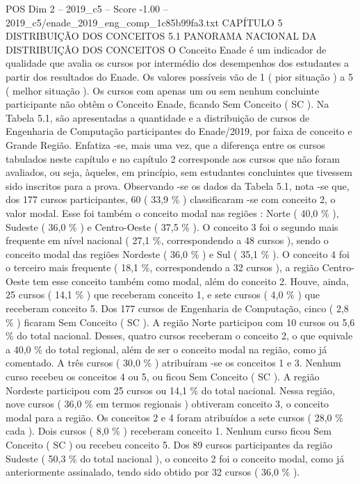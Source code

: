 \begin{textsample}{POS Dim 2 – 2019\_c5 – Score -1.00 – 2019\_c5/enade\_2019\_eng\_comp\_1c85b99fa3.txt}  \label{ex:f2_pos_336}
CAPÍTULO 5 DISTRIBUIÇÃO DOS CONCEITOS 5.1 PANORAMA NACIONAL DA DISTRIBUIÇÃO DOS CONCEITOS O Conceito Enade é um indicador de qualidade que avalia os cursos por intermédio dos desempenhos dos estudantes a partir dos resultados do Enade.
Os valores possíveis vão de 1 ( pior situação ) a 5 ( melhor situação ).
Os cursos com apenas um ou sem nenhum concluinte participante não obtêm o Conceito Enade, ficando Sem Conceito ( SC ).
Na Tabela 5.1, são apresentadas a quantidade e a distribuição de cursos de Engenharia de Computação participantes do Enade/2019, por faixa de conceito e Grande Região.
Enfatiza -se, mais uma vez, que a diferença entre os cursos tabulados neste capítulo e no capítulo 2 corresponde aos cursos que não foram avaliados, ou seja, àqueles, em princípio, sem estudantes concluintes que tivessem sido inscritos para a prova.
Observando -se os dados da Tabela 5.1, nota -se que, dos 177 cursos participantes, 60 ( 33,9 \% ) classificaram -se com conceito 2, o valor modal.
Esse foi também o conceito modal nas regiões : Norte ( 40,0 \% ), Sudeste ( 36,0 \% ) e Centro-Oeste ( 37,5 \% ).
O conceito 3 foi o segundo mais frequente em nível nacional ( 27,1 \%, correspondendo a 48 cursos ), sendo o conceito modal das regiões Nordeste ( 36,0 \% ) e Sul ( 35,1 \% ).
O conceito 4 foi o terceiro mais frequente ( 18,1 \%, correspondendo a 32 cursos ), a região Centro-Oeste tem esse conceito também como modal, além do conceito 2.
Houve, ainda, 25 cursos ( 14,1 \% ) que receberam conceito 1, e sete cursos ( 4,0 \% ) que receberam conceito 5.
Dos 177 cursos de Engenharia de Computação, cinco ( 2,8 \% ) ficaram Sem Conceito ( SC ).
A região Norte participou com 10 cursos ou 5,6 \% do total nacional.
Desses, quatro cursos receberam o conceito 2, o que equivale a 40,0 \% do total regional, além de ser o conceito modal na região, como já comentado.
A três cursos ( 30,0 \% ) atribuíram -se os conceitos 1 e 3.
Nenhum curso recebeu os conceitos 4 ou 5, ou ficou Sem Conceito ( SC ).
A região Nordeste participou com 25 cursos ou 14,1 \% do total nacional.
Nessa região, nove cursos ( 36,0 \% em termos regionais ) obtiveram conceito 3, o conceito modal para a região.
Os conceitos 2 e 4 foram atribuídos a sete cursos ( 28,0 \% cada ).
Dois cursos ( 8,0 \% ) receberam conceito 1.
Nenhum curso ficou Sem Conceito ( SC ) ou recebeu conceito 5.
Dos 89 cursos participantes da região Sudeste ( 50,3 \% do total nacional ), o conceito 2 foi o conceito modal, como já anteriormente assinalado, tendo sido obtido por 32 cursos ( 36,0 \% ).

\end{textsample}
